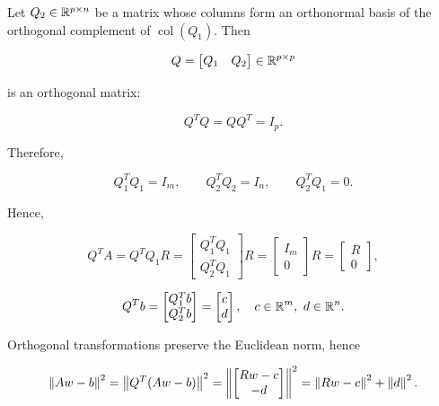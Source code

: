 \noindent Let $Q_2 \in \mathbb{R}^{p\times n}$ be a matrix whose columns form an orthonormal basis of the orthogonal
complement of $\operatorname{col}(Q_1)$. Then

\begin{equation}
    Q =
    \begin{bmatrix}
    Q_1 & Q_2
    \end{bmatrix}
    \in \mathbb{R}^{p\times p}
\end{equation}

\noindent is an orthogonal matrix:

\begin{equation}
    Q^T Q = Q Q^T = I_p.
\end{equation}

\noindent Therefore,

\begin{equation}
    Q_1^T Q_1 = I_m,
    \qquad
    Q_2^T Q_2 = I_{n},
    \qquad
    Q_2^T Q_1 = 0.
\end{equation}

\noindent Hence,

\begin{equation}
    Q^T A = Q^T Q_1 R =
    \begin{bmatrix}
        Q_1^T Q_1 \\ Q_2^T Q_1
    \end{bmatrix} R =
    \begin{bmatrix}
        I_m \\ 0
    \end{bmatrix} R =
    \begin{bmatrix}
        R \\ 0
    \end{bmatrix},
\end{equation}

\begin{equation}
    Q^T b =
    \begin{bmatrix}
        Q_1^T b \\ Q_2^T b
    \end{bmatrix} =
    \begin{bmatrix}
        c \\ d
    \end{bmatrix},
    \quad c\in\mathbb{R}^m,\ d\in\mathbb{R}^{n}.
\end{equation}

\noindent Orthogonal transformations preserve the Euclidean norm, hence

\begin{equation}
\label{eq:qr_residual_split}
    \left\|Aw-b\right\|^2
    =
    \left\|Q^T(Aw-b)\right\|^2
    =
    \left\|
        \begin{bmatrix}
            R w - c \\ -d
        \end{bmatrix}
    \right\|^2
    =
    \left\|Rw-c\right\|^2 + \left\|d\right\|^2.
\end{equation}

